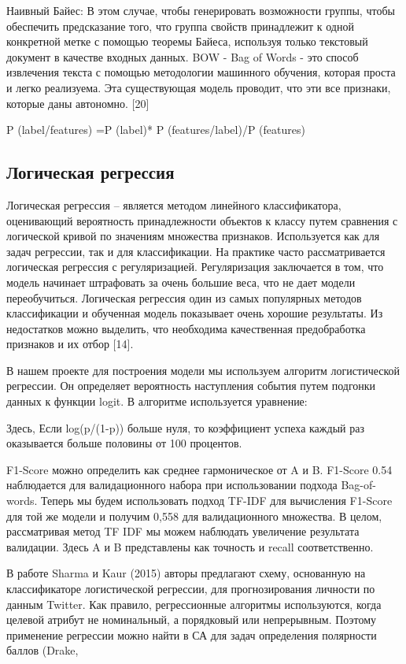 Наивный Байес: В этом случае, чтобы генерировать возможности группы, чтобы
обеспечить предсказание того, что группа свойств принадлежит к одной конкретной
метке с помощью теоремы Байеса, используя только текстовый документ в качестве
входных данных. BOW - Bag of Words - это способ извлечения текста с помощью
методологии машинного обучения, которая проста и легко реализуема. Эта
существующая модель проводит, что эти все признаки, которые даны автономно. [20]

P (label/features) =P (label)* P (features/label)/P (features)
\cite{article18}

\subsection{Логическая регрессия}

Логическая регрессия – является методом линейного классификатора, оценивающий
вероятность принадлежности объектов к классу путем сравнения с логической кривой
по значениям множества признаков. Используется как для задач регрессии, так и
для классификации.  На практике часто рассматривается логическая регрессия с
регуляризацией. Регуляризация заключается в том, что модель начинает штрафовать
за очень большие веса, что не дает модели переобучиться. Логическая регрессия
один из самых популярных методов классификации и обученная модель показывает
очень хорошие результаты. Из недостатков можно выделить, что необходима
качественная предобработка признаков и их отбор [14]. \cite{article9}

В нашем проекте для построения модели мы используем алгоритм логистической
регрессии. Он определяет вероятность наступления события путем подгонки данных к
функции logit. В алгоритме используется уравнение:

Здесь, Если log(p/(1-p)) больше нуля, то коэффициент успеха каждый раз
оказывается больше половины от 100 процентов.

F1-Score можно определить как среднее гармоническое от A и B. F1-Score 0.54
наблюдается для валидационного набора при использовании подхода Bag-of-words.
Теперь мы будем использовать подход TF-IDF для вычисления F1-Score для той же
модели и получим 0,558 для валидационного множества. В целом, рассматривая метод
TF IDF мы можем наблюдать увеличение результата валидации. Здесь A и B
представлены как точность и recall соответственно. \cite{article12}


В работе Sharma и Kaur (2015) авторы предлагают схему, основанную на
классификаторе логистической регрессии, для прогнозирования личности по данным
Twitter.  Как правило, регрессионные алгоритмы используются, когда целевой
атрибут не номинальный, а порядковый или непрерывным. Поэтому применение
регрессии можно найти в СА для задач определения полярности баллов (Drake,
\cite{article13}

